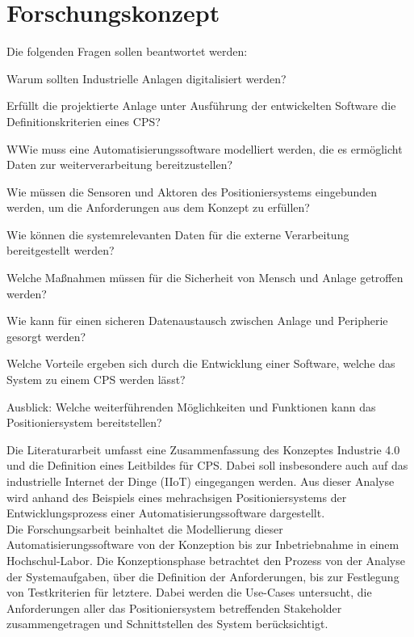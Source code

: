 \documentclass[12pt, a4paper, twoside]{article} %
\begin{document}
\section{Forschungskonzept}
Die folgenden Fragen sollen beantwortet werden:
\begin{compactitem}
	\item Warum sollten Industrielle Anlagen digitalisiert werden?
	\item Erfüllt die projektierte Anlage unter Ausführung der entwickelten Software die Definitionskriterien eines CPS?
	\item WWie muss eine Automatisierungssoftware modelliert werden, die es ermöglicht Daten zur weiterverarbeitung bereitzustellen?
	\item Wie müssen die Sensoren und Aktoren des Positioniersystems eingebunden werden, um die Anforderungen aus dem Konzept zu erfüllen?
	\item Wie können die systemrelevanten Daten für die externe Verarbeitung bereitgestellt werden?
	\item Welche Maßnahmen müssen für die Sicherheit von Mensch und Anlage getroffen werden?
	\item Wie kann für einen sicheren Datenaustausch zwischen Anlage und Peripherie gesorgt werden?
	\item Welche Vorteile ergeben sich durch die Entwicklung einer Software, welche das System zu einem CPS werden lässt?
	\item Ausblick: Welche weiterführenden Möglichkeiten und Funktionen kann das Positioniersystem bereitstellen?
\end{compactitem}
Die Literaturarbeit umfasst eine Zusammenfassung des Konzeptes Industrie 4.0 und die Definition eines Leitbildes für CPS.
Dabei soll insbesondere auch auf das industrielle Internet der Dinge (IIoT) eingegangen werden. Aus dieser Analyse wird anhand des Beispiels eines mehrachsigen Positioniersystems der Entwicklungsprozess einer Automatisierungssoftware dargestellt.\\
Die Forschungsarbeit beinhaltet die Modellierung dieser Automatisierungssoftware von der Konzeption bis zur Inbetriebnahme in einem Hochschul-Labor. Die Konzeptionsphase betrachtet den Prozess von der Analyse der Systemaufgaben, über die Definition der Anforderungen, bis zur Festlegung von Testkriterien für letztere. Dabei werden die Use-Cases untersucht, die Anforderungen aller das Positioniersystem betreffenden Stakeholder zusammengetragen und Schnittstellen des System berücksichtigt.\\
\end{document}
